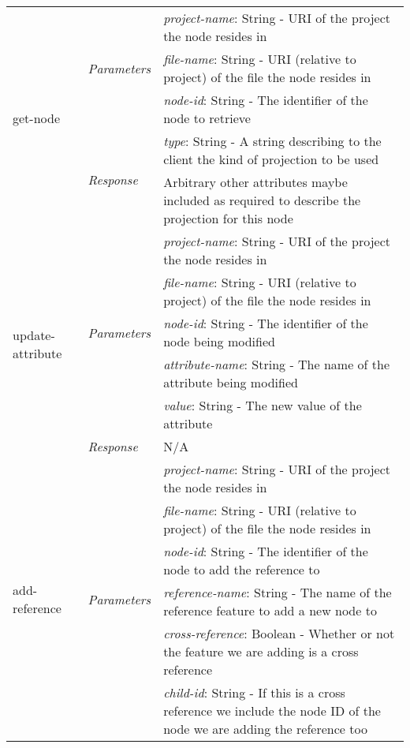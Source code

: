 \begin{table}[h!]
\begin{tabular}{| m{2.5cm}| m{2.3cm} | m{10.2cm} |}
\multirow{5}{*}{get-node} & \multirow{3}{*}{\emph{Parameters}} & \emph{project-name}: String - URI of the project the node resides in \\ \cline{3-3}
 & & \emph{file-name}: String -  URI (relative to project) of the file the node resides in \\ \cline{3-3}
 & & \emph{node-id}: String -  The identifier of the node to retrieve \\ \cline{2-3}
			& \multirow{2}{*}{\emph{Response}} & \emph{type}: String - A string describing to the client the kind of projection to be used \\ \cline{3-3}
 & & Arbitrary other attributes maybe included as required to describe the projection for this node\\ \cline{2-3}
			 \hline \hline	

\multirow{6}{*}{update-attribute} & \multirow{5}{*}{\emph{Parameters}} & \emph{project-name}: String - URI of the project the node resides in \\ \cline{3-3}
 & & \emph{file-name}: String -  URI (relative to project) of the file the node resides in \\ \cline{3-3}
 & & \emph{node-id}: String -  The identifier of the node being modified \\ \cline{3-3}
 & & \emph{attribute-name}: String - The name of the attribute being modified \\ \cline{3-3}
 & & \emph{value}: String - The new value of the attribute \\ \cline{2-3}
			& \multirow{1}{*}{\emph{Response}} & N/A \\
			 \hline \hline
			 
\multirow{8}{*}{add-reference} & 
 \multirow{7}{*}{\emph{Parameters}} 
   & \emph{project-name}: String - URI of the project the node resides in \\ \cline{3-3}
 & & \emph{file-name}: String -  URI (relative to project) of the file the node resides in \\ \cline{3-3}
 & & \emph{node-id}: String -  The identifier of the node to add the reference to \\ \cline{3-3}
 & & \emph{reference-name}: String - The name of the reference feature to add a new node to \\ \cline{3-3}
 & & \emph{cross-reference}: Boolean - Whether or not the feature we are adding is a cross reference  \\ \cline{3-3}
 & & \emph{child-id}: String - If this is a cross reference we include the node ID of the node we are adding the reference too \\ \hline

			 
\end{tabular}
\end{table}

